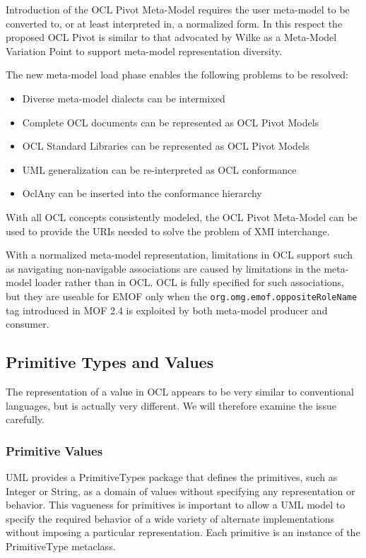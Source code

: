 \documentclass{eceasst}
\begin{document}
Introduction of the OCL Pivot Meta-Model requires the user meta-model to be converted to, or at least interpreted in, a normalized form. In this respect the proposed OCL Pivot is similar to that advocated by Wilke\cite{Variability} as a Meta-Model Variation Point to support meta-model representation diversity.

The new meta-model load phase enables the following problems to be resolved:

\begin{itemize}
\item Diverse meta-model dialects can be intermixed
\item Complete OCL documents can be represented as OCL Pivot Models
\item OCL Standard Libraries can be represented as OCL Pivot Models
\item UML generalization can be re-interpreted as OCL conformance
\item OclAny can be inserted into the conformance hierarchy
\end{itemize}

With all OCL concepts consistently modeled, the OCL Pivot Meta-Model can be used to provide the URIs needed to solve the problem of XMI interchange.

With a normalized meta-model representation, limitations in OCL support such as navigating non-navigable associations are caused by limitations in the meta-model loader rather than in OCL. OCL is fully specified for such associations, but they are useable for EMOF only when the \verb|org.omg.emof.oppositeRoleName| tag introduced in MOF 2.4\cite{MOF-2.4} is exploited by both meta-model producer and consumer.

\subsection{Primitive Types and Values}\label{Values}

The representation of a value in OCL appears to be very similar to conventional languages, but is actually very different. We will therefore examine the issue carefully.

\subsubsection{Primitive Values}

UML provides a PrimitiveTypes package that defines the primitives, such as Integer or String, as a domain of values without specifying any representation or behavior. This vagueness for primitives is important to allow a UML model to specify the required behavior of a wide variety of alternate implementations without imposing a particular representation. Each primitive is an instance of the PrimitiveType metaclass.
\end{document}
